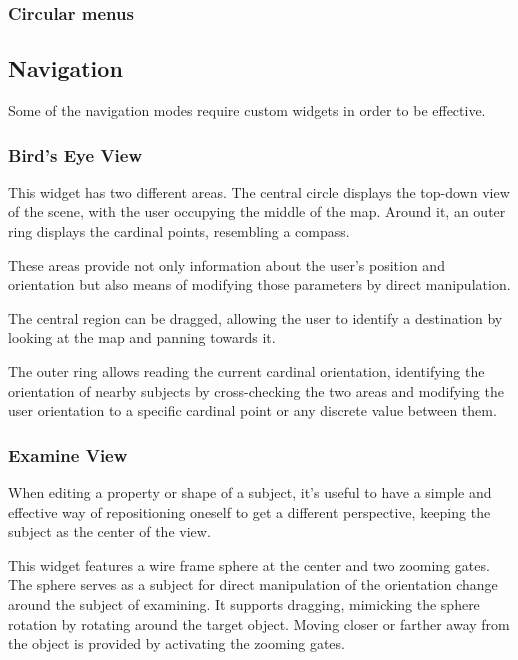 
\subsubsection{Circular menus}


\subsection{Navigation}

Some of the navigation modes require custom widgets in order to be effective.

\subsubsection{Bird's Eye View}

This widget has two different areas.
The central circle displays the top-down view of the scene, with the user occupying the middle of the map.
Around it, an outer ring displays the cardinal points, resembling a compass.

These areas provide not only information about the user's position and orientation but also means of
modifying those parameters by direct manipulation.


The central region can be dragged, allowing the user to identify a destination by looking at the map and
panning towards it.

The outer ring allows reading the current cardinal orientation,
identifying the orientation of nearby subjects by cross-checking the two areas and
modifying the user orientation to a specific cardinal point or any discrete value between them.


\subsubsection{Examine View}

When editing a property or shape of a subject, it's useful to have a simple and effective way
of repositioning oneself to get a different perspective, keeping the subject as the center of the view.


This widget features a wire frame sphere at the center and two zooming gates.
The sphere serves as a subject for direct manipulation of the orientation change around the subject of examining.
It supports dragging, mimicking the sphere rotation by rotating around the target object.
Moving closer or farther away from the object is provided by activating the zooming gates.


